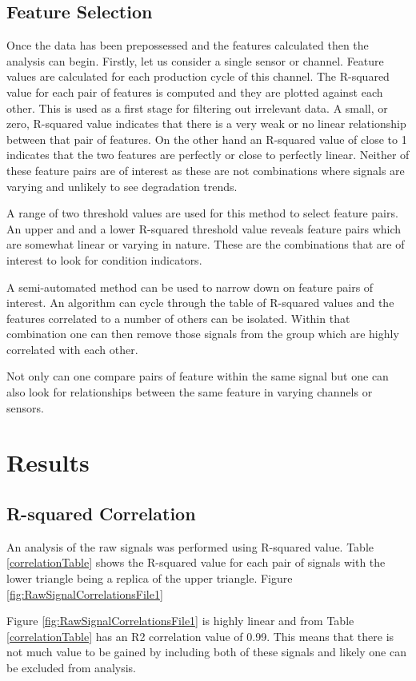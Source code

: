 \documentclass{article}
\begin{document}
\subsection{Feature Selection}
Once the data has been prepossessed and the features calculated then the analysis can begin. Firstly, let us consider a single sensor or channel. Feature values are calculated for each production cycle of this channel. The R-squared value for each pair of features is computed and they are plotted against each other. This is used as a first stage for filtering out irrelevant data. A small, or zero, R-squared value indicates that there is a very weak or no linear relationship between that pair of features. On the other hand an R-squared value of close to 1 indicates that the two features are perfectly or close to perfectly linear. Neither of these feature pairs are of interest as these are not combinations where signals are varying and unlikely to see degradation trends. 

A range of two threshold values are used for this method to select feature pairs. An upper and and a lower R-squared threshold value reveals feature pairs which are somewhat linear or varying in nature. These are the combinations that are of interest to look for condition indicators.

A semi-automated method can be used to narrow down on feature pairs of interest. An algorithm can cycle through the table of R-squared values and the features correlated to a number of others can be isolated. Within that combination one can then remove those signals from the group which are highly correlated with each other.

Not only can one compare pairs of feature within the same signal but one can also look for relationships between the same feature in varying channels or sensors. 
\section{Results}
\subsection{R-squared Correlation}
An analysis of the raw signals was performed using R-squared value. Table \ref{correlationTable} shows the R-squared value for each pair of signals with the lower triangle being a replica of the upper triangle. 
Figure \ref{fig:RawSignalCorrelationsFile1}
\begin{center}
    
\label{correlationTable}
\end{center}
Figure \ref{fig:RawSignalCorrelationsFile1} is highly linear and from Table \ref{correlationTable} has an R2 correlation value of 0.99. This means that there is not much value to be gained by including both of these signals and likely one can be excluded from analysis.
\end{document}
